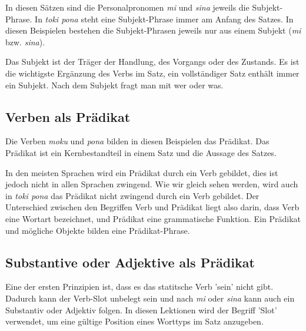 In diesen Sätzen sind die Personalpronomen \textit{mi} und \textit{sina} jeweils die Subjekt-Phrase. 
In \textit{toki pona} steht eine Subjekt-Phrase immer am Anfang des Satzes. 
In diesen Beispielen bestehen die Subjekt-Phrasen jeweils nur aus einem Subjekt (\textit{mi} bzw. \textit{sina}).

Das Subjekt ist der Träger der Handlung, des Vorgangs oder des Zustands. 
Es ist die wichtigste Ergänzung des Verbs im Satz, ein vollständiger Satz enthält immer ein Subjekt. 
Nach dem Subjekt fragt man mit wer oder was.

%
\subsection*{Verben als Prädikat}
%
%
Die Verben \textit{moku} und \textit{pona} bilden in diesen Beispielen das Prädikat.  
Das Prädikat ist ein Kernbestandteil in einem Satz und die Aussage des Satzes. 

In den meisten Sprachen wird ein Prädikat durch ein Verb gebildet, dies ist jedoch nicht in allen Sprachen zwingend. 
Wie wir gleich sehen werden, wird auch in \textit{toki pona} das Prädikat nicht zwingend durch ein Verb gebildet. 
Der Unterschied zwischen den Begriffen Verb und Prädikat liegt also darin, dass Verb eine Wortart bezeichnet, und Prädikat eine grammatische Funktion.
Ein Prädikat und mögliche Objekte bilden eine Prädikat-Phrase. 
%
\subsection*{Substantive oder Adjektive als Prädikat}
%
%
Eine der ersten Prinzipien ist, dass es das statitsche Verb 'sein' nicht gibt. 
Dadurch kann der Verb-Slot unbelegt sein und nach \textit{mi} oder \textit{sina} kann auch ein Substantiv oder Adjektiv folgen. 
In diesen Lektionen wird der Begriff 'Slot' verwendet, um eine gültige Position eines Worttyps im Satz anzugeben.

